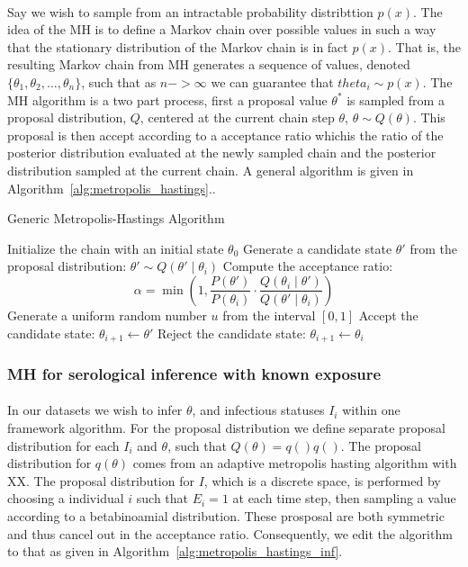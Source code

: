 \documentclass{article}
\begin{document}
\paragraph{}Say we wish to sample from an intractable probability distribttion $p(x)$. The idea of the MH is to define a Markov chain over possible values in such a way that the stationary distribution of the Markov chain is in fact $p(x)$. That is, the resulting Markov chain from MH generates a sequence of values, denoted $\{\theta_1, \theta_2, \dots,  \theta_n\}$, such that as $n -> \infty$ we can guarantee that $theta_i \sim p(x)$. The MH algorithm is a two part process, first a proposal value $\theta^*$ is sampled from a proposal distribution, $Q$, centered at the current chain step $\theta$, $\theta \sim Q(\theta)$. This proposal is then accept according to a acceptance ratio whichis the ratio of the posterior distribution evaluated at the newly sampled chain and the posterior distribution sampled at the current chain. A general algorithm is given in Algorithm~\ref{alg:metropolis_hastings}..
\begin{algorithm}
\caption{Generic Metropolis-Hastings Algorithm}
\label{alg:metropolis_hastings}
\begin{algorithmic}[1]
    \State Initialize the chain with an initial state $\theta_0$
        \State Generate a candidate state $\theta'$ from the proposal distribution: $\theta' \sim Q(\theta' \mid \theta_i)$
        \State Compute the acceptance ratio:
        \[
        \alpha = \min\left(1, \frac{P(\theta')}{P(\theta_i)} \cdot \frac{Q(\theta_i \mid \theta')}{Q(\theta' \mid \theta_i)}\right)
        \]
        \State Generate a uniform random number $u$ from the interval $[0, 1]$
            \State Accept the candidate state: $\theta_{i+1} \leftarrow \theta'$
        \Else
            \State Reject the candidate state: $\theta_{i+1} \leftarrow \theta_i$
        \EndIf
    \EndFor
\end{algorithmic}
\end{algorithm}

\subsubsection{MH for serological inference with known exposure }

\paragraph{}In our datasets we wish to infer $\theta$, and infectious statuses $I_i$ within one framework algorithm. For the proposal distribution we define separate proposal distribution for each $I_i$ and $\theta$, such that $Q(\theta) = q()q()$. The proposal distribution for $q(\theta)$ comes from an adaptive metropolis hasting algorithm with XX. The proposal distribution for $I$, which is a discrete space, is performed by choosing a individual $i$ such that $E_i = 1$ at each time step, then sampling a value according to a betabinoamial distribution. These prosposal are both symmetric and thus cancel out in the acceptance ratio. Consequently, we edit the algorithm to that as given in Algorithm~\ref{alg:metropolis_hastings_inf}.
\end{document}

